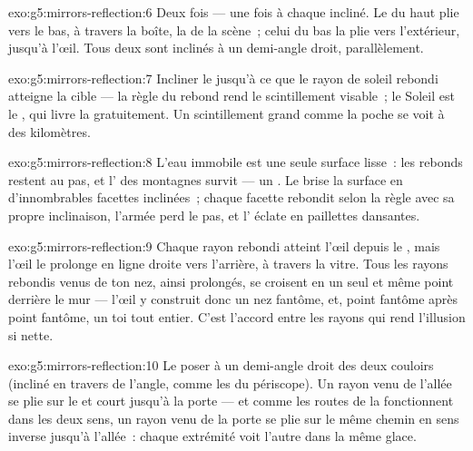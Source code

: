 \begin{solution}{exo:g5:mirrors-reflection:6}
Deux fois --- une fois à chaque  incliné. Le  du haut
plie vers le bas, à travers la boîte, la  de la scène~; celui
du bas la plie vers l'extérieur, jusqu'à l'œil. Tous deux sont
inclinés à un demi-angle droit, parallèlement.
\end{solution}

\begin{solution}{exo:g5:mirrors-reflection:7}
Incliner le  jusqu'à ce que le rayon de soleil rebondi
atteigne la cible --- la règle du rebond rend le scintillement
visable~; le Soleil est le , qui livre la 
gratuitement. Un scintillement grand comme la poche se voit à des
kilomètres.
\end{solution}

\begin{solution}{exo:g5:mirrors-reflection:8}
L'eau immobile est une seule surface lisse~: les rebonds restent au
pas, et l' des montagnes survit --- un . Le  brise la
surface en d'innombrables facettes inclinées~; chaque facette
rebondit selon la règle avec sa propre inclinaison, l'armée perd le
pas, et l' éclate en paillettes dansantes.
\end{solution}

\begin{solution}{exo:g5:mirrors-reflection:9}
Chaque rayon rebondi atteint l'œil depuis le , mais l'œil le
prolonge en ligne droite vers l'arrière, à travers la vitre. Tous les
rayons rebondis venus de ton nez, ainsi prolongés, se croisent en un
seul et même point derrière le mur --- l'œil y construit donc un nez
fantôme, et, point fantôme après point fantôme, un toi tout entier.
C'est l'accord entre les rayons qui rend l'illusion si nette.
\end{solution}

\begin{solution}{exo:g5:mirrors-reflection:10}
Le poser à un demi-angle droit des deux couloirs (incliné en travers
de l'angle, comme les  du périscope). Un rayon venu de l'allée
se plie sur le  et court jusqu'à la porte --- et comme les
routes de la  fonctionnent dans les deux sens, un rayon venu
de la porte se plie sur le même chemin en sens inverse jusqu'à
l'allée~: chaque extrémité voit l'autre dans la même glace.
\end{solution}

